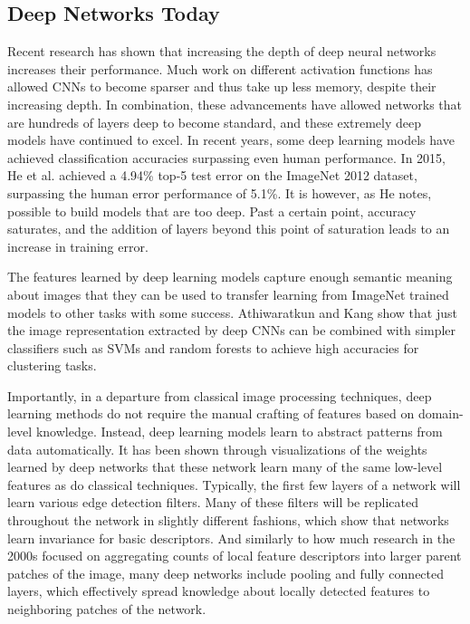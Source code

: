 \subsection{Deep Networks Today}
Recent research has shown that increasing the depth of deep neural networks increases their performance.\cite{szegedy2015going} Much work on different activation functions has allowed CNNs to become sparser and thus take up less memory, despite their increasing depth.\cite{simonyan2014very}\cite{szegedy2015going} In combination, these advancements have allowed networks that are hundreds of layers deep to become standard, and these extremely deep models have continued to excel.  In recent years, some deep learning models have achieved classification accuracies surpassing even human performance. In 2015, He et al. achieved a 4.94\% top-5 test error on the ImageNet 2012 dataset, surpassing the human error performance of 5.1\%\cite{he2016deep}. It is however, as He notes, possible to build models that are too deep. Past a certain point, accuracy saturates, and the addition of layers beyond this point of saturation leads to an increase in training error.

The features learned by deep learning models capture enough semantic meaning about images that they can be used to transfer learning from ImageNet trained models to other tasks with some success. Athiwaratkun and Kang show that just the image representation extracted by deep CNNs can be combined with simpler classifiers such as SVMs and random forests to achieve high accuracies for clustering tasks.\cite{athiwaratkun2015feature}

Importantly, in a departure from classical image processing techniques, deep learning methods do not require the manual crafting of features based on domain-level knowledge. Instead, deep learning models learn to abstract patterns from data automatically. It has been shown through visualizations of the weights learned by deep networks that these network learn many of the same low-level features as do classical techniques. Typically, the first few layers of a network will learn various edge detection filters. Many of these filters will be replicated throughout the network in slightly different fashions, which show that networks learn invariance for basic descriptors. And similarly to how much research in the 2000s focused on aggregating counts of local feature descriptors into larger parent patches of the image, many deep networks include pooling and fully connected layers, which effectively spread knowledge about locally detected features to neighboring patches of the network. 


